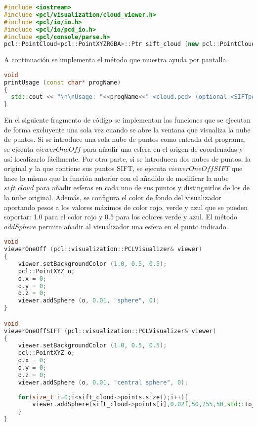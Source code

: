 \begin{lstlisting}[language=C++,breaklines]
#include <iostream>
#include <pcl/visualization/cloud_viewer.h>
#include <pcl/io/io.h>
#include <pcl/io/pcd_io.h>
#include <pcl/console/parse.h>
pcl::PointCloud<pcl::PointXYZRGBA>::Ptr sift_cloud (new pcl::PointCloud<pcl::PointXYZRGBA>);
\end{lstlisting}

A continuación se implementa el método que muestra ayuda por pantalla.

\begin{lstlisting}[language=C++,breaklines]
void 
printUsage (const char* progName)
{
  std::cout << "\n\nUsage: "<<progName<<" <cloud.pcd> (optional <SIFTpoints.pcd>)\n\n";
}
\end{lstlisting}

En el siguiente fragmento de código se implementan las funciones que se ejecutan de forma excluyente una sola vez cuando se abre la ventana que visualiza la nube de puntos. 
Si se introduce una sola nube de puntos como entrada del programa, se ejecuta $viewerOneOff$ para añadir una esfera en el origen de coordenadas y así localizarlo fácilmente.
Por otra parte, si se introducen dos nubes de puntos, la original y la que contiene sus puntos SIFT, se ejecuta $viewerOneOffSIFT$ que hace lo mismo que la función anterior con el añadido de modificar la nube $sift\_cloud$ para añadir esferas en cada uno de sus puntos y distinguirlos de los de la nube original.
Además, se configura el color de fondo del visualizador aportando pesos a los valores máximos de color rojo, verde y azul que se pueden soportar: 1.0 para el color rojo y 0.5 para los colores verde y azul. 
El método $addSphere$ permite añadir al visualizador una esfera en el punto indicado.

\begin{lstlisting}[language=C++,breaklines]
void 
viewerOneOff (pcl::visualization::PCLVisualizer& viewer)
{
    viewer.setBackgroundColor (1.0, 0.5, 0.5);
    pcl::PointXYZ o;
    o.x = 0;
    o.y = 0;
    o.z = 0;
    viewer.addSphere (o, 0.01, "sphere", 0); 
}

void 
viewerOneOffSIFT (pcl::visualization::PCLVisualizer& viewer)
{
    viewer.setBackgroundColor (1.0, 0.5, 0.5);
    pcl::PointXYZ o;
    o.x = 0;
    o.y = 0;
    o.z = 0;
    viewer.addSphere (o, 0.01, "central sphere", 0);
    
    for(size_t i=0;i<sift_cloud->points.size();i++){
    	viewer.addSphere(sift_cloud->points[i],0.02f,50,255,50,std::to_string(i));	
    }
}
\end{lstlisting}

